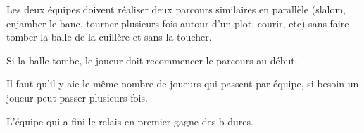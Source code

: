\documentclass{grand-jeu}
\begin{document}
\begin{liste-materiel}
\end{liste-materiel}


\begin{regles}
Les deux équipes doivent réaliser deux parcours similaires en parallèle (slalom, enjamber le banc, tourner plusieurs fois autour d'un plot, courir, etc) sans faire tomber la balle de la cuillère et sans la toucher. 

Si la balle tombe, le joueur doit recommencer le parcours au début.

Il faut qu'il y aie le même nombre de joueurs qui passent par équipe, si besoin un joueur peut passer plusieurs fois.

L'équipe qui a fini le relais en premier gagne des b-dures. 
\end{regles}

\begin{imaginaire}

\end{imaginaire}

\begin{moments-stop}
\end{moments-stop}
\end{document}
